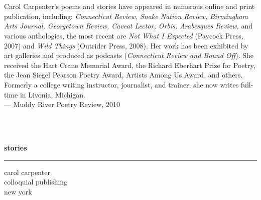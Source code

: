 \documentclass[openleft,10pt]{article}
\begin{document}
\noindent%
\begin{minipage}[t][9.861in][t]{6.625in}
  \noindent
  \centering
  \mbox{ } \hfill
  \hspace{0.6in}
  \begin{minipage}{3in}
    \vspace*{-6.25in}
    \\[4pt]
    Carol Carpenter's poems and stories have appeared in numerous online and
print publication, including: \emph{Connecticut Review, Snake Nation
Review, Birmingham Arts Journal, Georgetown Review, Caveat Lector,
Orbis, Arabesques Review,} and various anthologies, the most recent are
\emph{Not What I Expected} (Paycock Press, 2007) and \emph{Wild Things}
(Outrider Press, 2008). Her work has been exhibited by art galleries and
produced as podcasts (\emph{Connecticut Review and Bound Off}). She
received the Hart Crane Memorial Award, the Richard Eberhart Prize for
Poetry, the Jean Siegel Pearson Poetry Award, Artists Among Us Award,
and others. Formerly a college writing instructor, journalist, and
trainer, she now writes full-time in Livonia, Michigan.
\\[2pt]
\mbox{} \hfill {--- Muddy River Poetry Review}, 2010
\end{minipage}%
\hfill\mbox{ }\hspace*{0.25in}
\end{minipage}%
%
\hspace*{-0.125in}
%
\begin{minipage}[t][9.861in][t]{0.694in}
   \hspace*{0.125in}%
\end{minipage}%
%   
\begin{minipage}[t][9.861in][t]{6.625in}
  \noindent
  \vspace*{-6in} \mbox{ }
  \\
  \hspace*{1.625in} {\fontsize{86}{52}\sffamily\bfseries stories} \qquad
  \\[-4pt]
  \hspace*{1in}\rule{4.375in}{1.5pt}%
  \vspace*{2pt}
  \hspace*{3.115in} {\fontsize{24}{52}\sffamily carol carpenter} \qquad
  \\[5.5in]
  \hspace*{3.625in} {\sffamily\large colloquial publishing} \qquad
  \\
  \hspace*{4.585in} {\sffamily new york} \qquad
\end{minipage}
\vspace*{-8in}
\hspace*{-20in}
\end{document}

